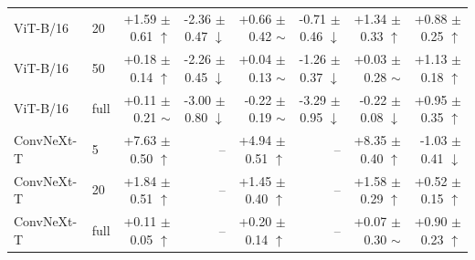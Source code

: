 \begin{table}[H]
{\begin{tabular}{llrrrrrr}
ViT-B/16 & 20 & +1.59 $\pm$ 0.61 $\uparrow$ & -2.36 $\pm$ 0.47 $\downarrow$ & +0.66 $\pm$ 0.42 $\sim$ & -0.71 $\pm$ 0.46 $\downarrow$ & +1.34 $\pm$ 0.33 $\uparrow$ & +0.88 $\pm$ 0.25 $\uparrow$ \\
ViT-B/16 & 50 & +0.18 $\pm$ 0.14 $\uparrow$ & -2.26 $\pm$ 0.45 $\downarrow$ & +0.04 $\pm$ 0.13 $\sim$ & -1.26 $\pm$ 0.37 $\downarrow$ & +0.03 $\pm$ 0.28 $\sim$ & +1.13 $\pm$ 0.18 $\uparrow$ \\
ViT-B/16 & full & +0.11 $\pm$ 0.21 $\sim$ & -3.00 $\pm$ 0.80 $\downarrow$ & -0.22 $\pm$ 0.19 $\sim$ & -3.29 $\pm$ 0.95 $\downarrow$ & -0.22 $\pm$ 0.08 $\downarrow$ & +0.95 $\pm$ 0.35 $\uparrow$ \\
\midrule
ConvNeXt-T & 5 & +7.63 $\pm$ 0.50 $\uparrow$ & -- & +4.94 $\pm$ 0.51 $\uparrow$ & -- & +8.35 $\pm$ 0.40 $\uparrow$ & -1.03 $\pm$ 0.41 $\downarrow$ \\
ConvNeXt-T & 20 & +1.84 $\pm$ 0.51 $\uparrow$ & -- & +1.45 $\pm$ 0.40 $\uparrow$ & -- & +1.58 $\pm$ 0.29 $\uparrow$ & +0.52 $\pm$ 0.15 $\uparrow$ \\
ConvNeXt-T & full & +0.11 $\pm$ 0.05 $\uparrow$ & -- & +0.20 $\pm$ 0.14 $\uparrow$ & -- & +0.07 $\pm$ 0.30 $\sim$ & +0.90 $\pm$ 0.23 $\uparrow$ \\
\bottomrule
\end{tabular}}
\end{table}
